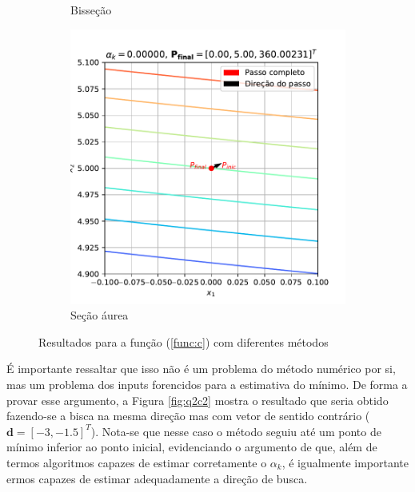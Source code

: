 \documentclass[10pt, a4paper]{article}
\begin{document}
\begin{figure}
\begin{subfigure}[b]{0.32\textwidth}
      \caption{Bisseção}
      \label{fig:q2c_2}
  \end{subfigure}
  \hfill
  \begin{subfigure}[b]{0.32\textwidth}
      \centering
      \includegraphics[width=\textwidth]{images/q2c_3.pdf}
      \caption{Seção áurea}
      \label{fig:q2c_3}
  \end{subfigure}
     \caption{Resultados para a função (\ref{func:c}) com diferentes métodos}
     \label{fig:q2c}
\end{figure}

É importante ressaltar que isso não é um problema do método numérico por si, mas um problema dos inputs forencidos para
a estimativa do mínimo. De forma a provar esse argumento, a Figura \ref{fig:q2c2} mostra o resultado que seria obtido 
fazendo-se a bisca na mesma direção mas com vetor de sentido contrário ($\mathbf{d} = [-3, -1.5]^T$). Nota-se que nesse caso o 
método seguiu até um ponto de mínimo inferior ao ponto inicial, evidenciando o argumento de que, além de termos algoritmos capazes de 
estimar corretamente o $\alpha_k$, é igualmente importante ermos capazes de estimar adequadamente a direção de busca.
\end{document}
